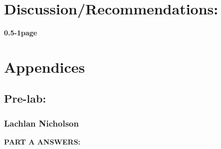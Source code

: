 \documentclass[11pt,a4paper]{article}
\begin{document}
\pagebreak
\section{Discussion/Recommendations:}
\textbf{0.5-1page}\\








\pagebreak
\section{Appendices}
\subsection{Pre-lab:}
\subsubsection{Lachlan Nicholson}
\textbf{PART A ANSWERS:}
\end{document}
